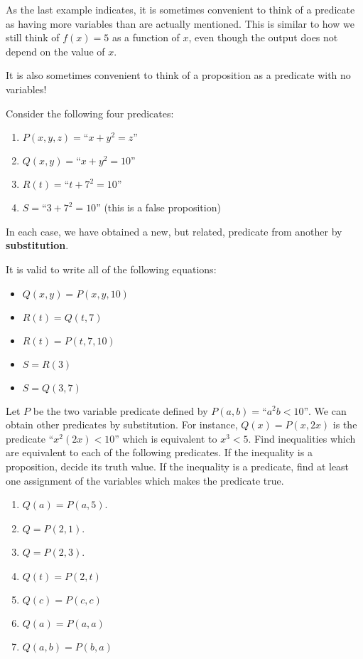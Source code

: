 As the last example indicates, it is sometimes convenient to think of a predicate as having more variables than are actually mentioned.  This is similar to how we still think of $f(x) = 5$ as a function of $x$, even though the output does not depend on the value of $x$.

It is also sometimes convenient to think of a proposition as a predicate with no variables!

Consider the following four predicates:

\begin{enumerate}
	\item $P(x,y,z) = \textrm{``\(x+y^2 = z\)''}$
	\item $Q(x,y) = \textrm{``\(x+y^2 = 10\)''}$
	\item $R(t) = \textrm{``\(t+7^2 = 10\)''}$
	\item $S = \textrm{``\(3+7^2 = 10\)''}$ (this is a false proposition)
	\end{enumerate}

In each case, we have obtained a new, but related, predicate from another by \textbf{substitution}.

It is valid to write all of the following equations:

\begin{itemize}
		\item $Q(x,y) = P(x,y,10)$
		\item $R(t) = Q(t,7)$
		\item $R(t) = P(t,7,10)$
		\item $S = R(3)$
		\item $S = Q(3,7)$
	\end{itemize}

\begin{xca}
 Let $P$ be the two variable predicate defined by $P(a,b) = \textrm{``\(a^2b < 10\)''}$.  We can obtain other predicates by substitution.  For instance, $Q(x) = P(x,2x)$ is the predicate $\textrm{``\(x^2(2x) < 10\)''}$ which is equivalent to $x^3 < 5$.  Find inequalities which are equivalent to each of the following predicates.  If the inequality is a proposition, decide its truth value.  If the inequality is a predicate, find at least one assignment of the variables which makes the predicate true.
		\begin{enumerate}
				\item $Q(a) = P(a,5)$.  
				\item $Q = P(2,1)$.  
				\item $Q = P(2,3)$.
				\item $Q(t) = P(2,t)$
				\item $Q(c) = P(c,c)$
				\item $Q(a) = P(a,a)$
				\item $Q(a,b) = P(b,a)$
		\end{enumerate}
	\end{xca}

